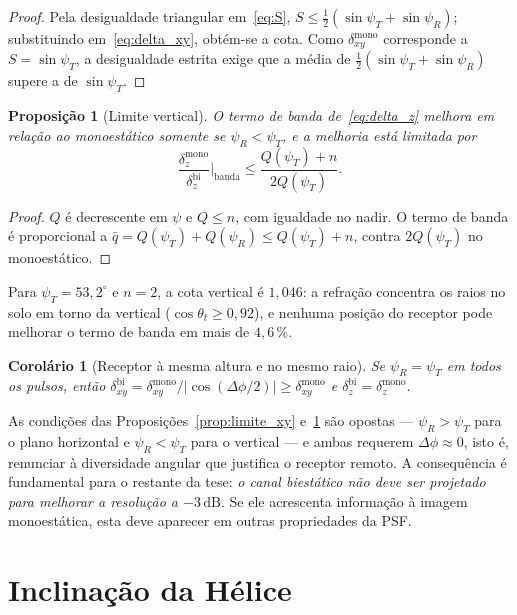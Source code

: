 \documentclass[12pt,a4paper,oneside]{book}
\theoremstyle{remark}
\newcommand{\dB}{\,\mathrm{dB}}
\theoremstyle{plain}
\newtheorem{proposicao}{Proposição}[chapter]
\newtheorem{corolario}{Corolário}[chapter]
\theoremstyle{definition}
\begin{document}
\begin{proof}
Pela desigualdade triangular em~\eqref{eq:S},
$S\le\tfrac12(\sin\psi_T+\sin\psi_R)$; substituindo em~\eqref{eq:delta_xy},
obtém-se a cota. Como $\delta_{xy}^{\text{mono}}$ corresponde a
$S=\sin\psi_T$, a desigualdade estrita exige que a média de
$\tfrac12(\sin\psi_T+\sin\psi_R)$ supere a de $\sin\psi_T$.
\end{proof}

\begin{proposicao}[Limite vertical]
\label{prop:limite_z}
O termo de banda de~\eqref{eq:delta_z} melhora em relação ao monoestático
somente se $\psi_R<\psi_T$, e a melhoria está limitada por
\begin{equation}
  \frac{\delta_z^{\text{mono}}}{\delta_z^{\text{bi}}}\bigg|_{\text{banda}}\le\frac{Q(\psi_T)+n}{2Q(\psi_T)} .
\end{equation}
\end{proposicao}

\begin{proof}
$Q$ é decrescente em $\psi$ e $Q\le n$, com igualdade no nadir. O termo de
banda é proporcional a $\bar q=Q(\psi_T)+Q(\psi_R)\le Q(\psi_T)+n$, contra
$2Q(\psi_T)$ no monoestático.
\end{proof}

Para $\psi_T=53,2^\circ$ e $n=2$, a cota vertical é $1,046$: a refração
concentra os raios no solo em torno da vertical ($\cos\theta_t\ge0,92$), e
nenhuma posição do receptor pode melhorar o termo de banda em mais de
$4,6\,\%$.

\begin{corolario}[Receptor à mesma altura e no mesmo raio]
\label{cor:mesma_altura}
Se $\psi_R=\psi_T$ em todos os pulsos, então
$\delta_{xy}^{\text{bi}}=\delta_{xy}^{\text{mono}}/|\cos(\Delta\phi/2)|\ge\delta_{xy}^{\text{mono}}$
e $\delta_z^{\text{bi}}=\delta_z^{\text{mono}}$.
\end{corolario}

As condições das Proposições~\ref{prop:limite_xy} e~\ref{prop:limite_z} são
opostas --- $\psi_R>\psi_T$ para o plano horizontal e $\psi_R<\psi_T$ para o
vertical --- e ambas requerem $\Delta\phi\approx0$, isto é, renunciar à
diversidade angular que justifica o receptor remoto. A consequência é
fundamental para o restante da tese: \emph{o canal biestático não deve ser
projetado para melhorar a resolução a $-3\dB$}. Se ele acrescenta informação
à imagem monoestática, esta deve aparecer em outras propriedades da PSF.

\section{Inclinação da Hélice}
\label{sec:helix_opt}
\end{document}
